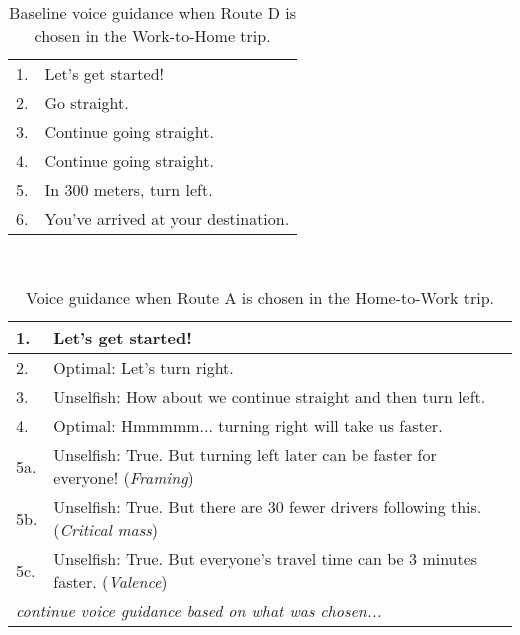 \begin{table}[h]
\centering
\caption{Baseline voice guidance when Route D is chosen in the Work-to-Home trip.}~\label{tab:c-base-D}
\begin{tabular}{ll}
\hline
1. & Let's get started!                  \\
2. & Go straight.                        \\
3. & Continue going straight.            \\
4. & Continue going straight.            \\
5. & In 300 meters, turn left.           \\
6. & You've arrived at your destination. \\ \hline
\end{tabular}
\end{table}

\begin{table}[h]
\centering
\caption{Voice guidance when Route A is chosen in the Home-to-Work trip.}~\label{tab:c-AB}
\begin{tabular}{ll}
\hline
1.                      & Let's get started!                                                                                   \\ \hline
\multicolumn{1}{|l}{2.} & \multicolumn{1}{l|}{Optimal: Let's turn right.}                              \\
\multicolumn{1}{|l}{3.} & \multicolumn{1}{l|}{Unselfish: How about we continue straight and then turn left.}                   \\
\multicolumn{1}{|l}{4.} & \multicolumn{1}{l|}{Optimal: Hmmmmm... turning right will take us faster.}                           \\
\multicolumn{1}{|l}{5a.} & \multicolumn{1}{l|}{Unselfish: True. But turning left later can be faster for everyone! (\textit{Framing})}   \\
\multicolumn{1}{|l}{5b.} & \multicolumn{1}{l|}{Unselfish: True. But there are 30 fewer drivers following this. (\textit{Critical mass})} \\
\multicolumn{1}{|l}{5c.} & \multicolumn{1}{l|}{Unselfish: True. But everyone's travel time can be 3 minutes faster. (\textit{Valence})}  \\ \hline
\multicolumn{2}{l}{\textit{continue voice guidance based on what was chosen...}}                                               \\ \hline
\end{tabular}
\end{table}

